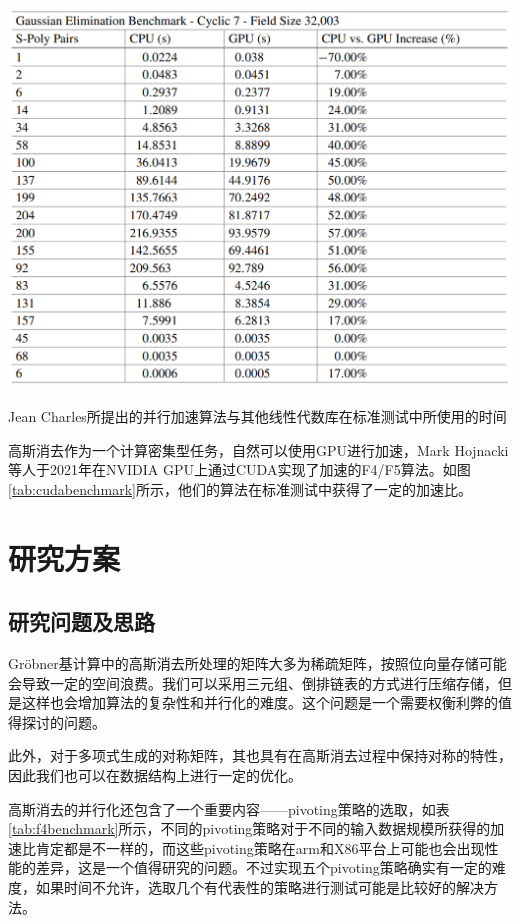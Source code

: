 \documentclass[a4paper]{article}
\begin{document}
\begin{table}[!htbp]
    \centering
    \includegraphics[width=5.4in]{fig/cuda.png}
    \caption{Jean Charles所提出的并行加速算法与其他线性代数库在标准测试中所使用的时间\cite{faugere2010parallel}}
    \label{tab:cudabenchmark}
\end{table}

高斯消去作为一个计算密集型任务，自然可以使用GPU进行加速，Mark Hojnacki等人于2021年在NVIDIA GPU上通过CUDA实现了加速的F4/F5算法。如图\ref{tab:cudabenchmark}所示，他们的算法在标准测试中获得了一定的加速比。





\section{研究方案}

\subsection{研究问题及思路}

Gröbner基计算中的高斯消去所处理的矩阵大多为稀疏矩阵，按照位向量存储可能会导致一定的空间浪费。我们可以采用三元组、倒排链表的方式进行压缩存储，但是这样也会增加算法的复杂性和并行化的难度。这个问题是一个需要权衡利弊的值得探讨的问题。

此外，对于多项式生成的对称矩阵，其也具有在高斯消去过程中保持对称的特性，因此我们也可以在数据结构上进行一定的优化。\cite{lin_liu_song_2011}

高斯消去的并行化还包含了一个重要内容——pivoting策略的选取，如表\ref{tab:f4benchmark}所示，不同的pivoting策略对于不同的输入数据规模所获得的加速比肯定都是不一样的，而这些pivoting策略在arm和X86平台上可能也会出现性能的差异，这是一个值得研究的问题。不过实现五个pivoting策略确实有一定的难度，如果时间不允许，选取几个有代表性的策略进行测试可能是比较好的解决方法。
\end{document}
